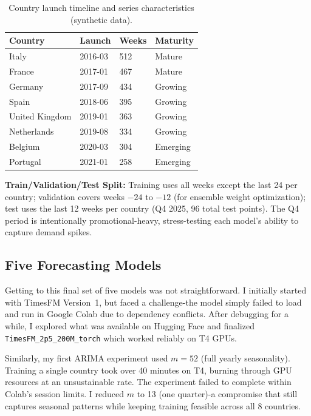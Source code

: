 \documentclass[11pt,a4paper]{article}
\begin{document}
\begin{table}[H]
\caption{Country launch timeline and series characteristics (synthetic data).}
\setlength{\tabcolsep}{16pt}
\renewcommand{\arraystretch}{1.4}
\begin{tabular}{l l l l}
\toprule
\textbf{Country} & \textbf{Launch} & \textbf{Weeks} & \textbf{Maturity} \\
\midrule
Italy & 2016-03 & 512 & Mature \\
France & 2017-01 & 467 & Mature \\
Germany & 2017-09 & 434 & Growing \\
Spain & 2018-06 & 395 & Growing \\
United Kingdom & 2019-01 & 363 & Growing \\
Netherlands & 2019-08 & 334 & Growing \\
Belgium & 2020-03 & 304 & Emerging \\
Portugal & 2021-01 & 258 & Emerging \\
\bottomrule
\end{tabular}
\end{table}

\textbf{Train/Validation/Test Split:} Training uses all weeks except the last 24 per country; validation covers weeks $-24$ to $-12$ (for ensemble weight optimization); test uses the last 12 weeks per country (Q4 2025, 96 total test points). The Q4 period is intentionally promotional-heavy, stress-testing each model's ability to capture demand spikes.

\subsection{Five Forecasting Models}

Getting to this final set of five models was not straightforward. I initially started with TimesFM Version~1, but faced a challenge-the model simply failed to load and run in Google Colab due to dependency conflicts. After debugging for a while, I explored what was available on Hugging Face and finalized \texttt{TimesFM\_2p5\_200M\_torch} which worked reliably on T4 GPUs.

Similarly, my first ARIMA experiment used $m\!=\!52$ (full yearly seasonality). Training a single country took over 40 minutes on T4, burning through GPU resources at an unsustainable rate. The experiment failed to complete within Colab's session limits. I reduced $m$ to 13 (one quarter)-a compromise that still captures seasonal patterns while keeping training feasible across all 8 countries.
\end{document}
